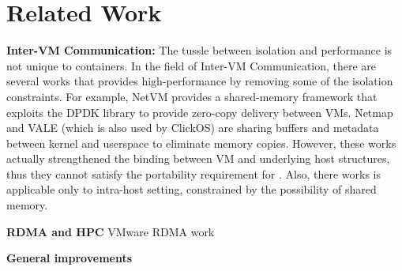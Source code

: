 \section{Related Work} \label{sec:related}


\textbf{Inter-VM Communication:} 
The tussle between isolation and performance is not unique to containers.
In the field of Inter-VM Communication, there are several works that provides
high-performance by removing some of the isolation constraints.
For example, NetVM\cite{netvm} provides a shared-memory framework that
exploits the DPDK library to provide zero-copy delivery between VMs.
Netmap\cite{netmap} and VALE\cite{vale} (which is also used by ClickOS\cite{clickos}) 
are sharing buffers and metadata between kernel and userspace to eliminate memory copies.
However, these works actually strengthened the binding between VM and underlying host
structures, thus they cannot satisfy the portability requirement for \sysname. 
Also, there works is applicable only to intra-host setting, constrained by the possibility
of shared memory.

\textbf{RDMA and HPC}
VMware RDMA work

\textbf{General improvements}

